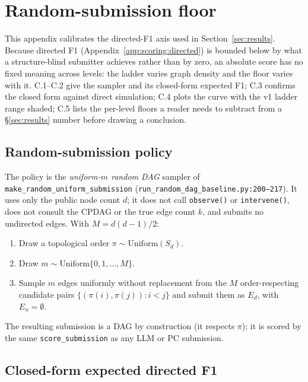 \section{Random-submission floor}
\label{app:floor}

This appendix calibrates the directed-F1 axis used in Section~\ref{sec:results}. Because directed F1 (Appendix~\ref{app:scoring:directed}) is bounded below by what a structure-blind submitter achieves rather than by zero, an absolute score has no fixed meaning across levels: the ladder varies graph density and the floor varies with it. C.1--C.2 give the sampler and its closed-form expected F1; C.3 confirms the closed form against direct simulation; C.4 plots the curve with the v1 ladder range shaded; C.5 lists the per-level floors a reader needs to subtract from a §\ref{sec:results} number before drawing a conclusion.

\subsection{Random-submission policy}
\label{app:floor:policy}

The policy is the \emph{uniform-$m$ random DAG} sampler of \texttt{make\_random\_uniform\_submission} (\texttt{run\_random\_dag\_baseline.py:200--217}). It uses only the public node count $d$; it does not call \texttt{observe()} or \texttt{intervene()}, does not consult the CPDAG or the true edge count $k$, and submits no undirected edges. With $M = d(d-1)/2$:
\begin{enumerate}
\itemsep0pt
\item Draw a topological order $\pi \sim \mathrm{Uniform}(S_d)$.
\item Draw $m \sim \mathrm{Uniform}\{0, 1, \ldots, M\}$.
\item Sample $m$ edges uniformly without replacement from the $M$ order-respecting candidate pairs $\{(\pi(i), \pi(j)) : i < j\}$ and submit them as $E_d$, with $E_u = \emptyset$.
\end{enumerate}
The resulting submission is a DAG by construction (it respects $\pi$); it is scored by the same \texttt{score\_submission} as any LLM or PC submission.

\subsection{Closed-form expected directed F1}
\label{app:floor:closed}

